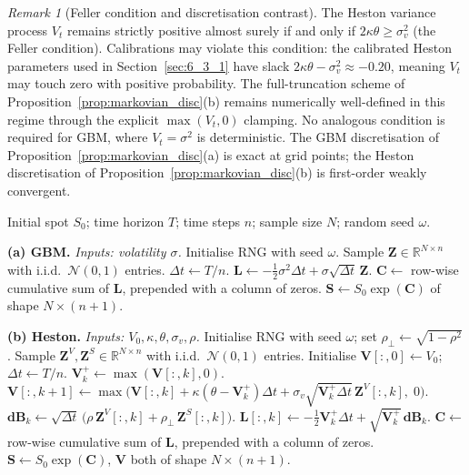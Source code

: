 \documentclass[12pt,a4paper]{article}
\theoremstyle{definition}
\theoremstyle{plain}
\theoremstyle{remark}
\newtheorem{remark}{Remark}[section]
\theoremstyle{plain}
\begin{document}
\begin{remark}[Feller condition and discretisation contrast]
\label{rem:feller}
The Heston variance process $V_t$ remains strictly positive almost surely
if and only if $2\kappa\theta \geq \sigma_v^2$ (the Feller condition).
Calibrations may violate this condition: the calibrated Heston parameters
used in Section~\ref{sec:6_3_1} have slack
$2\kappa\theta - \sigma_v^2 \approx -0.20$, meaning $V_t$ may touch zero with
positive probability. The full-truncation scheme of
Proposition~\ref{prop:markovian_disc}(b) remains numerically well-defined in
this regime through the explicit $\max(V_t, 0)$ clamping. No analogous
condition is required for GBM, where $V_t = \sigma^2$ is deterministic. The
GBM discretisation of Proposition~\ref{prop:markovian_disc}(a) is exact at
grid points; the Heston discretisation of
Proposition~\ref{prop:markovian_disc}(b) is first-order weakly convergent.
\end{remark}

\begin{algorithm}[H]
\caption{Path simulation for Markovian benchmark models}\label{alg:markovian_sim}
\begin{algorithmic}[1]
\Require Initial spot $S_0$; time horizon $T$; time steps $n$;
sample size $N$; random seed $\omega$.

\State \textbf{(a) GBM.} \emph{Inputs: volatility $\sigma$.}
\State Initialise RNG with seed $\omega$.
\State Sample $\mathbf{Z} \in \mathbb{R}^{N \times n}$ with i.i.d.\ $\mathcal{N}(0,1)$ entries.
\State $\Delta t \leftarrow T / n$.
\State $\mathbf{L} \leftarrow -\tfrac{1}{2}\sigma^2 \Delta t + \sigma \sqrt{\Delta t}\, \mathbf{Z}$.
\State $\mathbf{C} \leftarrow$ row-wise cumulative sum of $\mathbf{L}$, prepended with a column of zeros.
\State \Return $\mathbf{S} \leftarrow S_0 \exp(\mathbf{C})$ of shape $N \times (n+1)$.

\Statex
\State \textbf{(b) Heston.} \emph{Inputs: $V_0, \kappa, \theta, \sigma_v, \rho$.}
\State Initialise RNG with seed $\omega$; set $\rho_\perp \leftarrow \sqrt{1 - \rho^2}$.
\State Sample $\mathbf{Z}^V, \mathbf{Z}^S \in \mathbb{R}^{N \times n}$ with i.i.d.\ $\mathcal{N}(0,1)$ entries.
\State Initialise $\mathbf{V}[:, 0] \leftarrow V_0$; $\Delta t \leftarrow T/n$.
  \State $\mathbf{V}^+_k \leftarrow \max(\mathbf{V}[:,k], 0)$.
  \State $\mathbf{V}[:, k+1] \leftarrow \max\!\Big(\mathbf{V}[:,k] + \kappa(\theta - \mathbf{V}^+_k)\Delta t
  + \sigma_v \sqrt{\mathbf{V}^+_k \Delta t}\, \mathbf{Z}^V[:,k],\; 0\Big)$.
  \State $\mathbf{dB}_k \leftarrow \sqrt{\Delta t}\,\big(\rho\, \mathbf{Z}^V[:,k] + \rho_\perp\, \mathbf{Z}^S[:,k]\big)$.
  \State $\mathbf{L}[:, k] \leftarrow -\tfrac{1}{2}\mathbf{V}^+_k \Delta t + \sqrt{\mathbf{V}^+_k}\, \mathbf{dB}_k$.
\EndFor
\State $\mathbf{C} \leftarrow$ row-wise cumulative sum of $\mathbf{L}$, prepended with a column of zeros.
\State \Return $\mathbf{S} \leftarrow S_0 \exp(\mathbf{C})$, $\mathbf{V}$ both of shape $N \times (n+1)$.
\end{algorithmic}
\end{algorithm}
\end{document}
